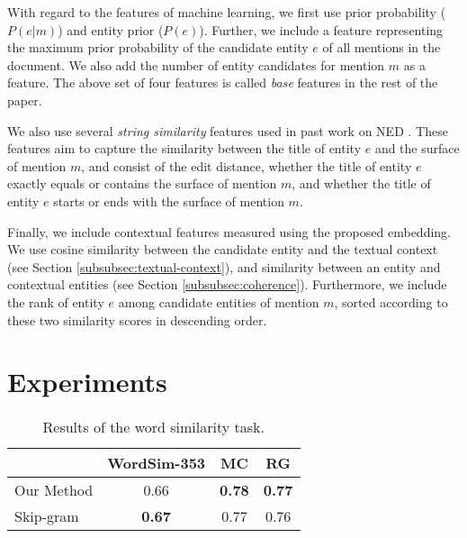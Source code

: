 \documentclass[11pt,letterpaper]{article}
\begin{document}
With regard to the features of machine learning, we first use prior probability ($P(e|m)$) and entity prior ($P(e)$).
Further, we include a feature representing the maximum prior probability of the candidate entity $e$ of all mentions in the document.
We also add the number of entity candidates for mention $m$ as a feature.
The above set of four features is called \textit{base} features in the rest of the paper.

We also use several \textit{string similarity} features used in past work on NED \cite{Meij2012}.
These features aim to capture the similarity between the title of entity $e$ and the surface of mention $m$, and consist of the edit distance, whether the title of entity $e$ exactly equals or contains the surface of mention $m$, and whether the title of entity $e$ starts or ends with the surface of mention $m$.

Finally, we include contextual features measured using the proposed embedding.
We use cosine similarity between the candidate entity and the textual context (see Section \ref{subsubsec:textual-context}), and similarity between an entity and contextual entities (see Section \ref{subsubsec:coherence}).
Furthermore, we include the rank of entity $e$ among candidate entities of mention $m$, sorted according to these two similarity scores in descending order.

\section{Experiments}
\label{sec:experiments}

\begin{table}[t]
\centering
\begin{tabular}{l|ccc}
\hline
& WordSim-353 & MC & RG \\
\hline
Our Method & 0.66 & \textbf{0.78} & \textbf{0.77} \\
Skip-gram & \textbf{0.67} & 0.77 & 0.76 \\
\hline
\end{tabular}
\caption{Results of the word similarity task.}
\label{tb:word-sim-scores}
\end{table}
\end{document}
